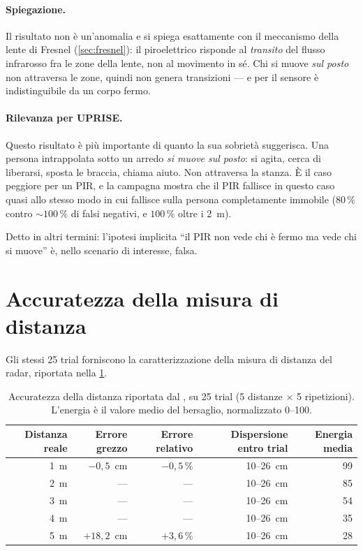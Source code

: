 \paragraph{Spiegazione.} Il risultato non è un'anomalia e si spiega esattamente con
il meccanismo della lente di Fresnel (\cref{sec:fresnel}): il piroelettrico
risponde al \emph{transito} del flusso infrarosso fra le zone della lente, non al
movimento in sé. Chi si muove \emph{sul posto} non attraversa le zone, quindi non
genera transizioni --- e per il sensore è indistinguibile da un corpo fermo.

\paragraph{Rilevanza per UPRISE.} Questo risultato è più importante di quanto la
sua sobrietà suggerisca. Una persona intrappolata sotto un arredo \emph{si muove sul
posto}: si agita, cerca di liberarsi, sposta le braccia, chiama aiuto. Non attraversa
la stanza. È il caso peggiore per un PIR, e la campagna mostra che il PIR fallisce
in questo caso quasi allo stesso modo in cui fallisce sulla persona completamente
immobile ($80\,\%$ contro $\sim\!100\,\%$ di falsi negativi, e $100\,\%$ oltre i 2~m).

Detto in altri termini: l'ipotesi implicita ``il PIR non vede chi è fermo ma vede
chi si muove'' è, nello scenario di interesse, falsa.

\section{Accuratezza della misura di distanza}
\label{sec:distanza}

Gli stessi 25 trial forniscono la caratterizzazione della misura di distanza del
radar, riportata nella \cref{tab:distanza}.

\begin{table}[htbp]
\centering
\caption{Accuratezza della distanza riportata dal \ldb, su 25 trial (5 distanze
$\times$ 5 ripetizioni). L'energia è il valore medio del bersaglio, normalizzato
0--100.}
\label{tab:distanza}
\small
\begin{tabular}{@{}rrrrr@{}}
\toprule
\textbf{Distanza reale} & \textbf{Errore grezzo} & \textbf{Errore relativo} &
\textbf{Dispersione entro trial} & \textbf{Energia media} \\
\midrule
1~m & $-0{,}5$~cm & $-0{,}5\,\%$ & 10--26~cm & 99 \\
2~m & --- & --- & 10--26~cm & 85 \\
3~m & --- & --- & 10--26~cm & 54 \\
4~m & --- & --- & 10--26~cm & 35 \\
5~m & $+18{,}2$~cm & $+3{,}6\,\%$ & 10--26~cm & 28 \\
\bottomrule
\end{tabular}
\end{table}

